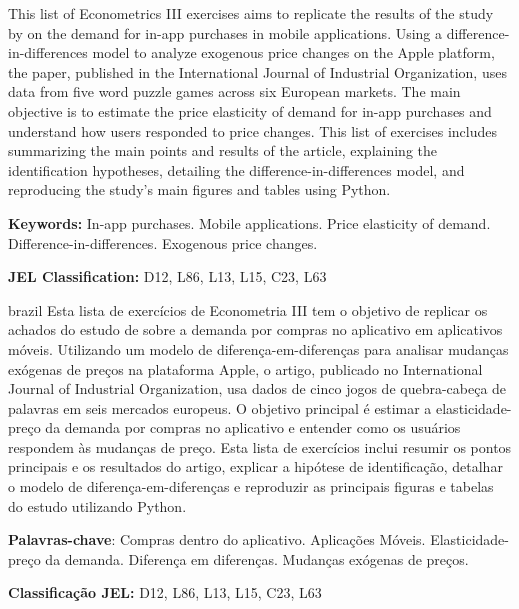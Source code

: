 \documentclass[
	article,
	12pt,
	oneside,
	a4paper,
	english,
	brazil,
	sumario=tradicional
]{abntex2}
\begin{document}
\frenchspacing

\maketitle
{}

	\begin{resumoumacoluna}
	\noindent
	This list of Econometrics III exercises aims to replicate the results of the study by \cite{ENACHE2023102945} on the demand for in-app purchases in mobile applications. Using a difference-in-differences model to analyze exogenous price changes on the Apple platform, the paper, published in the International Journal of Industrial Organization, uses data from five word puzzle games across six European markets. The main objective is to estimate the price elasticity of demand for in-app purchases and understand how users responded to price changes. This list of exercises includes summarizing the main points and results of the article, explaining the identification hypotheses, detailing the difference-in-differences model, and reproducing the study's main figures and tables using Python.
	
	\textbf{Keywords:} In-app purchases. Mobile applications. Price elasticity of demand. Difference-in-differences. Exogenous price changes.
	
	\textbf{JEL Classification: }D12, L86, L13, L15, C23, L63
	\end{resumoumacoluna}

\newpage

\renewcommand{\resumoname}{Resumo}
\begin{resumoumacoluna}
\begin{otherlanguage*}{brazil}
   \noindent 
   Esta lista de exercícios de Econometria III tem o objetivo de replicar os achados do estudo de \cite{ENACHE2023102945} sobre a demanda por compras no aplicativo em aplicativos móveis. Utilizando um modelo de diferença-em-diferenças para analisar mudanças exógenas de preços na plataforma Apple, o artigo, publicado no International Journal of Industrial Organization, usa dados de cinco jogos de quebra-cabeça de palavras em seis mercados europeus. O objetivo principal é estimar a elasticidade-preço da demanda por compras no aplicativo e entender como os usuários respondem às mudanças de preço. Esta lista de exercícios inclui resumir os pontos principais e os resultados do artigo, explicar a hipótese de identificação, detalhar o modelo de diferença-em-diferenças e reproduzir as principais figuras e tabelas do estudo utilizando Python. 
   
   \textbf{Palavras-chave}: Compras dentro do aplicativo. Aplicações Móveis. Elasticidade-preço da demanda. Diferença em diferenças. Mudanças exógenas de preços.
   
   \textbf{Classificação JEL:  }D12, L86, L13, L15, C23, L63
 \end{otherlanguage*}  
\end{resumoumacoluna}

\newpage


\textual



\postextual
\renewcommand{\refname}{Referências}



%
\end{document}
